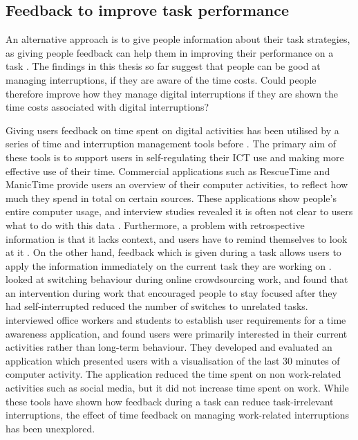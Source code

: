 \subsection{Feedback to improve task performance}
An alternative approach is to give people information about their task strategies, as giving people feedback can help them in improving their performance on a task \citep{Maior2018, Farmer2017}. The findings in this thesis so far suggest that people can be good at managing interruptions, if they are aware of the time costs. Could people therefore improve how they manage digital interruptions if they are shown the time costs associated with digital interruptions? 

Giving users feedback on time spent on digital activities has been utilised by a series of time and interruption management tools before \citep{Lyngs2018}. The primary aim of these tools is to support users in self-regulating their ICT use and making more effective use of their time. Commercial applications such as RescueTime and ManicTime provide users an overview of their computer activities, to reflect how much they spend in total on certain sources. These applications show people’s entire computer usage, and interview studies revealed it is often not clear to users what to do with this data \citep{Collins2014}. Furthermore, a problem with retrospective information is that it lacks context, and users have to remind themselves to look at it \citep{Whittaker2016}. On the other hand, feedback which is given during a task allows users to apply the information immediately on the current task they are working on \citep{Gould2016a, Maior2018}. \citet{Gould2016a} looked at switching behaviour during online crowdsourcing work, and found that an intervention during work that encouraged people to stay focused after they had self-interrupted reduced the number of switches to unrelated tasks. \citet{Whittaker2016} interviewed office workers and students to establish user requirements for a time awareness application, and found users were primarily interested in their current activities rather than long-term behaviour. They developed and evaluated an application which presented users with a visualisation of the last 30 minutes of computer activity. The application reduced the time spent on non work-related activities such as social media, but it did not increase time spent on work. While these tools have shown how feedback during a task can reduce task-irrelevant interruptions, the effect of time feedback on managing work-related interruptions has been unexplored.

